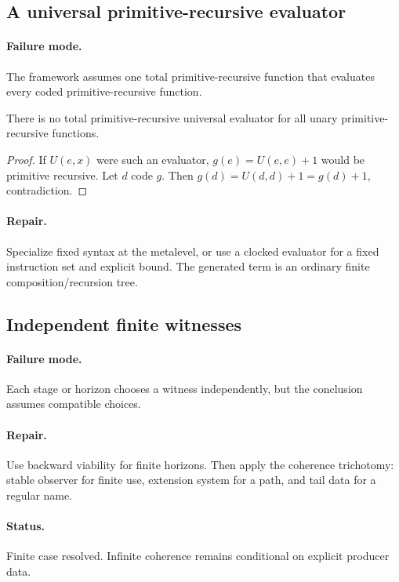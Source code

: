 \subsection{A universal primitive-recursive evaluator}

\paragraph{Failure mode.}
The framework assumes one total primitive-recursive function that evaluates every coded primitive-recursive function.

\begin{barrier}
There is no total primitive-recursive universal evaluator for all unary primitive-recursive functions.
\end{barrier}

\begin{proof}
If \(U(e,x)\) were such an evaluator, \(g(e)=U(e,e)+1\) would be primitive recursive.  Let \(d\) code \(g\).  Then \(g(d)=U(d,d)+1=g(d)+1\), contradiction.
\end{proof}

\paragraph{Repair.}
Specialize fixed syntax at the metalevel, or use a clocked evaluator for a fixed instruction set and explicit bound.  The generated term is an ordinary finite composition/recursion tree.

\subsection{Independent finite witnesses}

\paragraph{Failure mode.}
Each stage or horizon chooses a witness independently, but the conclusion assumes compatible choices.

\paragraph{Repair.}
Use backward viability for finite horizons.  Then apply the coherence trichotomy: stable observer for finite use, extension system for a path, and tail data for a regular name.

\paragraph{Status.}
Finite case resolved.  Infinite coherence remains conditional on explicit producer data.

